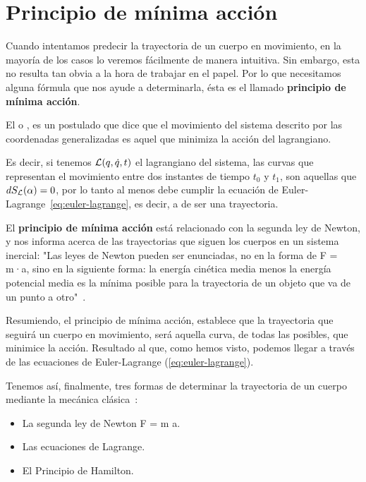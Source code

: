 \section{Principio de mínima acción}\label{sec:principio-de-minima-accion}

Cuando intentamos predecir la trayectoria de un cuerpo en movimiento, en la mayoría de los casos lo veremos fácilmente de manera intuitiva. Sin embargo, esta no resulta tan obvia a la hora de trabajar en el papel. Por lo que necesitamos alguna fórmula que nos ayude a determinarla, ésta es el llamado \textbf{principio de mínima acción}.

El  o , es un postulado que dice que el movimiento del sistema descrito por las coordenadas generalizadas es aquel que minimiza la acción del lagrangiano\label{po:pma}.

Es decir, si tenemos $\mathcal{L}(q,\dot{q}, t)$ el lagrangiano del sistema, las curvas que representan el movimiento entre dos instantes de tiempo $t_0$ y $t_1$, son aquellas que $dS_{\mathcal{L}}(\alpha)=0$, por lo tanto al menos debe cumplir la ecuación de Euler-Lagrange~\eqref{eq:euler-lagrange}, es decir, a de ser una trayectoria.

El \textbf{principio de mínima acción} está relacionado con la segunda ley de Newton, y nos informa acerca de las trayectorias que siguen los cuerpos en un sistema inercial:
"Las leyes de Newton pueden ser enunciadas, no en la forma de F = m·a, sino en la siguiente forma: la energía cinética media menos la energía potencial media es la mínima posible para la trayectoria de un objeto que va de un punto a otro"~\cite{Feynman}.

Resumiendo, el principio de mínima acción, establece que la trayectoria que seguirá un cuerpo en movimiento, será aquella curva, de todas las posibles, que minimice la acción. Resultado al que, como hemos visto, podemos llegar a través de las ecuaciones de Euler-Lagrange (\eqref{eq:euler-lagrange}).

Tenemos así, finalmente, tres formas de determinar la trayectoria de un cuerpo mediante la mecánica clásica~\autocite[264]{Taylor}:
\begin{itemize}
    \item La segunda ley de Newton F = m \cdot a.
    \item Las ecuaciones de Lagrange.
    \item El Principio de Hamilton.
\end{itemize}